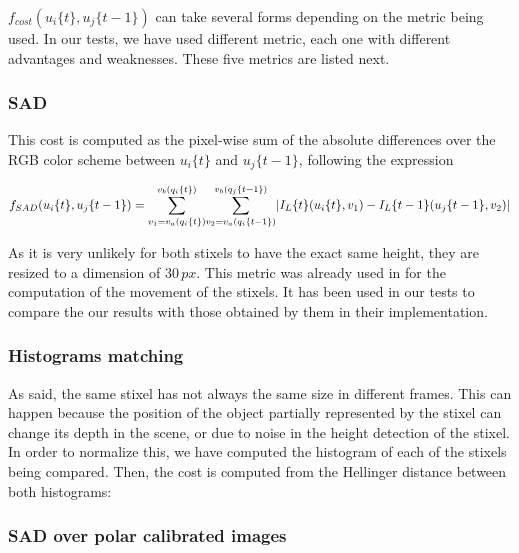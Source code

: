 $f_{cost}(u_i\{t\}, u_j\{t - 1\})$ can take several forms depending on the metric being used. In our tests, we have used  different metric, each one with different advantages and weaknesses. These five metrics are listed next.

\subsubsection{\acf{SAD}}\label{ch:chapter04_01_03_01}

This cost is computed as the pixel-wise sum of the absolute differences over the RGB color scheme between $u_i\{t\}$ and $u_j\{t - 1\}$, following the expression

\begin{equation}\label{eq:cp04_stixel_movement_sad_cost}
\tiny
f_{SAD}(u_i\{t\}, u_j\{t - 1\}) = 
\overset{v_b(q_i\{t\})}{\underset{v_1=v_a(q_i\{t\})}{\sum}}
\overset{v_b(q_j\{t - 1\})}{\underset{v_2=v_a(q_i\{t - 1\})}{\sum}}
| I_L\{t\}(u_i\{t\}, v_1) - I_L\{t - 1\}(u_j\{t - 1\}, v_2) |
\end{equation}

As it is very unlikely for both stixels to have the exact same height, they are resized to a dimension of $30\,px$. This metric was already used in \cite{gunyel2012stixels} for the computation of the movement of the stixels. It has been used in our tests to compare the our results with those obtained by them in their implementation.

\subsubsection{Histograms matching}\label{ch:chapter04_01_03_02}

As said, the same stixel has not always the same size in different frames. This can happen because the position of the object partially represented by the stixel can change its depth in the scene, or due to noise in the height detection of the stixel. In order to normalize this, we have computed the histogram of each of the stixels being compared. Then, the cost is computed from the Hellinger distance between both histograms:



\subsubsection{\ac{SAD} over polar calibrated images}\label{ch:chapter04_01_03_03}
